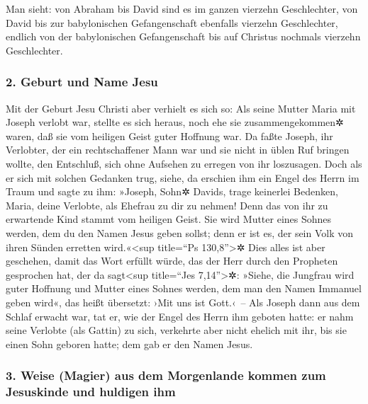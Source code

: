  Man sieht: von Abraham bis David sind es im ganzen
vierzehn Geschlechter, von David bis zur babylonischen Gefangenschaft
ebenfalls vierzehn Geschlechter, endlich von der babylonischen
Gefangenschaft bis auf Christus nochmals vierzehn Geschlechter.

\hypertarget{geburt-und-name-jesu}{%
\subsubsection{2. Geburt und Name Jesu}\label{geburt-und-name-jesu}}

 Mit der Geburt Jesu Christi aber verhielt es sich so:
Als seine Mutter Maria mit Joseph verlobt war, stellte es sich heraus,
noch ehe sie zusammengekommen✲ waren, daß sie vom heiligen Geist guter
Hoffnung war.  Da faßte Joseph, ihr Verlobter, der ein
rechtschaffener Mann war und sie nicht in üblen Ruf bringen wollte, den
Entschluß, sich ohne Aufsehen zu erregen von ihr loszusagen.
 Doch als er sich mit solchen Gedanken trug, siehe, da
erschien ihm ein Engel des Herrn im Traum und sagte zu ihm: »Joseph,
Sohn✲ Davids, trage keinerlei Bedenken, Maria, deine Verlobte, als
Ehefrau zu dir zu nehmen! Denn das von ihr zu erwartende Kind stammt vom
heiligen Geist.  Sie wird Mutter eines Sohnes werden, dem
du den Namen Jesus geben sollst; denn er ist es, der sein Volk von ihren
Sünden erretten wird.«\textless sup title=``Ps 130,8''\textgreater✲
 Dies alles ist aber geschehen, damit das Wort erfüllt
würde, das der Herr durch den Propheten gesprochen hat, der da
sagt\textless sup title=``Jes 7,14''\textgreater✲: 
»Siehe, die Jungfrau wird guter Hoffnung und Mutter eines Sohnes werden,
dem man den Namen Immanuel geben wird«, das heißt übersetzt: ›Mit uns
ist Gott.‹~--  Als Joseph dann aus dem Schlaf erwacht
war, tat er, wie der Engel des Herrn ihm geboten hatte: er nahm seine
Verlobte (als Gattin) zu sich,  verkehrte aber nicht
ehelich mit ihr, bis sie einen Sohn geboren hatte; dem gab er den Namen
Jesus.

\hypertarget{weise-magier-aus-dem-morgenlande-kommen-zum-jesuskinde-und-huldigen-ihm}{%
\subsubsection{3. Weise (Magier) aus dem Morgenlande kommen zum
Jesuskinde und huldigen
ihm}\label{weise-magier-aus-dem-morgenlande-kommen-zum-jesuskinde-und-huldigen-ihm}}

